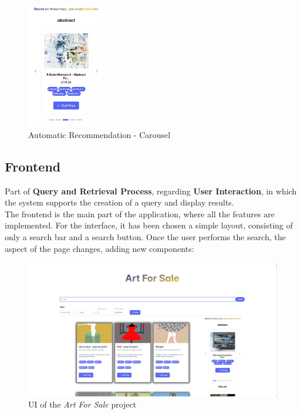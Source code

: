 \documentclass[12pt]{spieman}  %
\begin{document}
\begin{spacing}{1}
    \begin{figure}[H]
        \centering
        \caption{Automatic Recommendation - Carousel}
        \label{fig:carousel}
        \includegraphics[width=0.3\textwidth, trim={0cm 0cm 0cm 0cm}]{figures/recommendation-carousel.jpeg}
    \end{figure}

    \subsection{Frontend}\label{sec:frontend}
    Part of \textbf{Query and Retrieval Process},
    regarding \textbf{User Interaction}, in which the system supports the creation of a query and display results.\\
    The frontend is the main part of the application, where all the features are implemented.
    For the interface, it has been chosen a simple layout, consisting of only a search bar and a search button.
    Once the user performs the search, the aspect of the page changes, adding new components:

    \begin{figure}[H]
        \centering
        \caption{UI of the \textit{Art For Sale} project}
        \label{fig:carousel}
        \includegraphics[width=\textwidth, trim={7cm 0cm 7cm 2cm}, clip]{figures/ui.jpeg}
    \end{figure}


\end{spacing}
\end{document}
